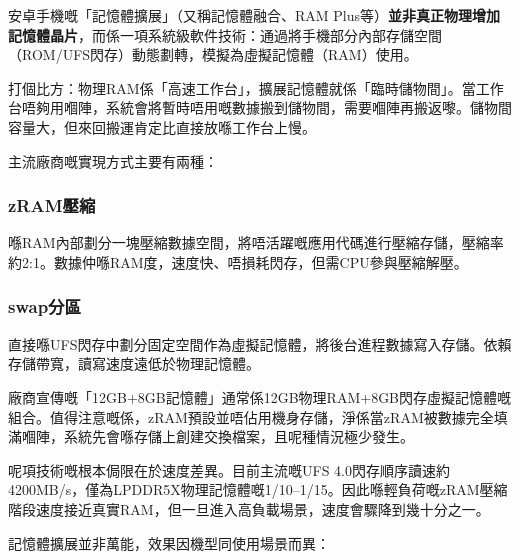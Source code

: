 


安卓手機嘅「記憶體擴展」（又稱記憶體融合、RAM Plus等）\textbf{並非真正物理增加記憶體晶片}，而係一項系統級軟件技術：通過將手機部分內部存儲空間（ROM/UFS閃存）動態劃轉，模擬為虛擬記憶體（RAM）使用。

打個比方：物理RAM係「高速工作台」，擴展記憶體就係「臨時儲物間」。當工作台唔夠用嗰陣，系統會將暫時唔用嘅數據搬到儲物間，需要嗰陣再搬返嚟。儲物間容量大，但來回搬運肯定比直接放喺工作台上慢。


主流廠商嘅實現方式主要有兩種：

\subsubsection*{zRAM壓縮}

喺RAM內部劃分一塊壓縮數據空間，將唔活躍嘅應用代碼進行壓縮存儲，壓縮率約2:1。數據仲喺RAM度，速度快、唔損耗閃存，但需CPU參與壓縮解壓。

\subsubsection*{swap分區}

直接喺UFS閃存中劃分固定空間作為虛擬記憶體，將後台進程數據寫入存儲。依賴存儲帶寬，讀寫速度遠低於物理記憶體。

廠商宣傳嘅「12GB+8GB記憶體」通常係12GB物理RAM+8GB閃存虛擬記憶體嘅組合。值得注意嘅係，zRAM預設並唔佔用機身存儲，淨係當zRAM被數據完全填滿嗰陣，系統先會喺存儲上創建交換檔案，且呢種情況極少發生。


呢項技術嘅根本侷限在於速度差異。目前主流嘅UFS 4.0閃存順序讀速約4200MB/s，僅為LPDDR5X物理記憶體嘅1/10–1/15。因此喺輕負荷嘅zRAM壓縮階段速度接近真實RAM，但一旦進入高負載場景，速度會驟降到幾十分之一。


記憶體擴展並非萬能，效果因機型同使用場景而異：

